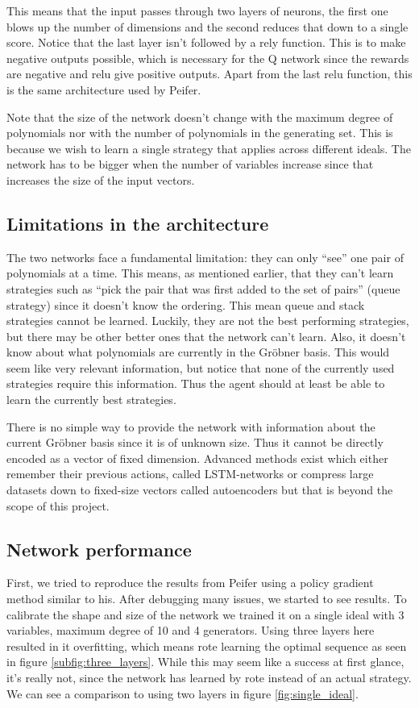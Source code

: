 \documentclass{article}
\theoremstyle{changedot}
\theoremstyle{changedotbreak}
\theoremstyle{nonumberplain}
\begin{document}
This means that the input passes through two layers of neurons, the first one blows up the number of dimensions and the second reduces that down to a single score. Notice that the last layer isn't followed by a rely function. This is to make negative outputs possible, which is necessary for the Q network since the rewards are negative and relu give positive outputs. Apart from the last relu function, this is the same architecture used by Peifer.

Note that the size of the network doesn't change with the maximum degree of polynomials nor with the number of polynomials in the generating set. This is because we wish to learn a single strategy that applies across different ideals. The network has to be bigger when the number of variables increase since that increases the size of the input vectors.

\subsection{Limitations in the architecture}\label{sec:limits}
The two networks face a fundamental limitation: they can only ``see'' one pair of polynomials at a time. This means, as mentioned earlier, that they can't learn strategies such as ``pick the pair that was first added to the set of pairs'' (queue strategy) since it doesn't know the ordering. This mean queue and stack strategies cannot be learned. Luckily, they are not the best performing strategies, but there may be other better ones that the network can't learn. Also, it doesn't know about what polynomials are currently in the Gröbner basis. This would seem like very relevant information, but notice that none of the currently used strategies require this information. Thus the agent should at least be able to learn the currently best strategies.

 There is no simple way to provide the network with information about the current Gröbner basis since it is of unknown size. Thus it cannot be directly encoded as a vector of fixed dimension. Advanced methods exist which either remember their previous actions, called LSTM-networks \cite{LSTM} or compress large datasets down to fixed-size vectors called autoencoders \cite{autoencoder} but that is beyond the scope of this project.

\subsection{Network performance}
First, we tried to reproduce the results from Peifer \cite{peifer} using a policy gradient method similar to his. After debugging many issues, we started to see results. To calibrate the shape and size of the network we trained it on a single ideal with 3 variables, maximum degree of 10 and 4 generators. Using three layers here resulted in it overfitting, which means rote learning the optimal sequence as seen in figure \ref{subfig:three_layers}. While this may seem like a success at first glance, it's really not, since the network has learned by rote instead of an actual strategy. We can see a comparison to using two layers in figure \ref{fig:single_ideal}.
\end{document}
